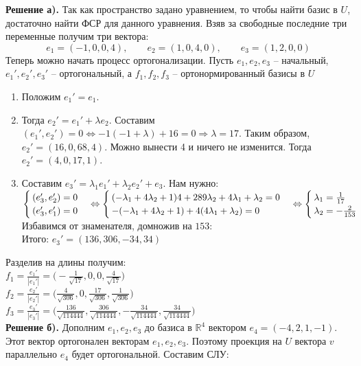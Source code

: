 \documentclass[a4paper, 12pt]{article}
\begin{document}
\begin{spacing}{1}
\noindent \textbf{Решение а).} Так как пространство задано уравнением, то чтобы найти базис в $U$, достаточно найти ФСР для данного уравнения. Взяв за свободные последние три переменные получим три вектора:
$$
e_1 = (-1, 0, 0, 4), \qquad
e_2 = (1,0,4,0), \qquad
e_3 = (1,2,0,0)
$$
Теперь можно начать процесс ортогонализации. Пусть $e_1, e_2, e_3$ -- начальный, $e_1', e_2', e_3'$ -- ортогональный, а $f_1, f_2, f_3$ -- ортонормированный базисы в $U$  
\begin{enumerate}
	\item Положим $e_1' = e_1$.
	\item Тогда $e_2' = e_1' + \lambda e_2$. Составим $(e_1', e_2') = 0 \Leftrightarrow -1(-1+\lambda) + 16 = 0 \Rightarrow \lambda = 17$. Таким образом, $e_2' = (16, 0, 68, 4)$. Можно вынести 4 и ничего не изменится. Тогда $e_2' = (4, 0, 17, 1)$.
	\item Составим $e_3' = \lambda_1 e_1' + \lambda_2 e_2' + e_3.$ Нам нужно: \\
	$\begin{cases}
		(e_3', e_2') = 0\\
		(e_3', e_1') = 0
	\end{cases} \Leftrightarrow
	\begin{cases}
		(-\lambda_1 + 4\lambda_2 + 1)4 + 289\lambda_2 + 4\lambda_1 + \lambda_2 = 0\\
		-(-\lambda_1 + 4\lambda_2 + 1) + 4(4\lambda_1 + \lambda_2) = 0
	\end{cases} \\[7pt]
	\Leftrightarrow \begin{cases}
		\lambda_1 = \frac{1}{17}\\
		\lambda_2 = -\frac{2}{153}
	\end{cases}$ Избавимся от знаменателя, домножив на $153$:\\
	 Итого: $e_3' = (136, 306, -34, 34)$
\end{enumerate}
Разделив на длины получим:\\
$\displaystyle f_1 = \frac{e_1'}{|e_1'|} = \bigg(-\frac{1}{\sqrt{17}}, 0, 0, \frac{4}{\sqrt{17}}\bigg)$\\
$\displaystyle f_2 =\frac{e_2'}{|e_2'|} = \bigg(\frac{4}{\sqrt{306}}, 0, \frac{17}{\sqrt{306}}, \frac{1}{\sqrt{306}}\bigg)$\\
$\displaystyle f_3 = \frac{e_3'}{|e_3'|} =\bigg(\frac{136}{\sqrt{114444}}, \frac{306}{\sqrt{114444}}, -\frac{34}{\sqrt{114444}}, \frac{34}{\sqrt{114444}}\bigg)$\\[10pt]
\noindent \textbf{Решение б).} Дополним $e_1, e_2, e_3$ до базиса в $\mathbb{R}^4$ вектором $e_4 = (-4, 2, 1, -1)$. Этот вектор ортогонален векторам $e_1, e_2, e_3$. Поэтому проекция на $U$ вектора $v$ параллельно $e_4$ будет ортогональной. Составим СЛУ:

\end{spacing}
\end{document}
